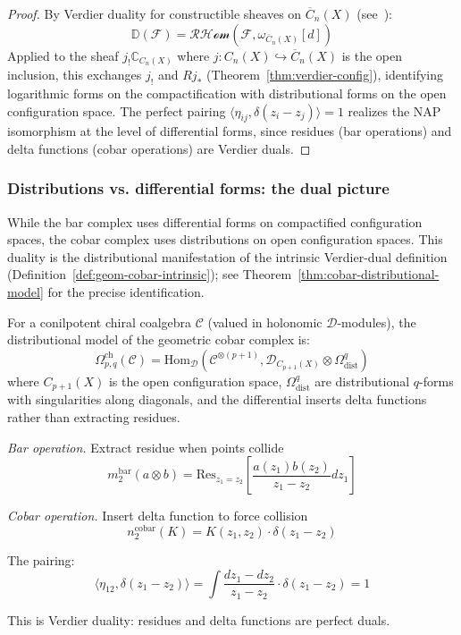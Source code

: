 \begin{proof}
By Verdier duality for constructible sheaves on $\overline{C}_n(X)$ (see~\cite{KashiwaraSchapira}):
\[\mathbb{D}(\mathcal{F}) = \mathcal{RHom}(\mathcal{F}, \omega_{\overline{C}_n(X)}[d])\]
Applied to the sheaf $j_!\mathbb{C}_{C_n(X)}$ where $j: C_n(X) \hookrightarrow \overline{C}_n(X)$ is the open inclusion, this exchanges $j_!$ and $Rj_*$ (Theorem~\ref{thm:verdier-config}), identifying logarithmic forms on the compactification with distributional forms on the open configuration space. The perfect pairing $\langle \eta_{ij}, \delta(z_i - z_j) \rangle = 1$ realizes the NAP isomorphism at the level of differential forms, since residues (bar operations) and delta functions (cobar operations) are Verdier duals.
\end{proof}

\subsubsection{Distributions vs. differential forms: the dual picture}

While the bar complex uses differential forms on compactified configuration spaces, the cobar complex uses distributions on open configuration spaces. This duality is the distributional manifestation of the intrinsic Verdier-dual definition (Definition~\ref{def:geom-cobar-intrinsic}); see Theorem~\ref{thm:cobar-distributional-model} for the precise identification.

\begin{definition}\label{def:geom-cobar-precise}
For a conilpotent chiral coalgebra $\mathcal{C}$ (valued in holonomic $\mathcal{D}$-modules), the distributional model of the geometric cobar complex is:
\[\Omega^{\text{ch}}_{p,q}(\mathcal{C}) = \text{Hom}_{\mathcal{D}}\left(\mathcal{C}^{\otimes(p+1)}, \mathcal{D}_{C_{p+1}(X)} \otimes \Omega^q_{\text{dist}}\right)\]
where $C_{p+1}(X)$ is the open configuration space, $\Omega^q_{\text{dist}}$ are distributional $q$-forms with singularities along diagonals, and the differential inserts delta functions rather than extracting residues.
\end{definition}

\begin{example}
\emph{Bar operation.} Extract residue when points collide
\[m_2^{\text{bar}}(a \otimes b) = \text{Res}_{z_1=z_2}\left[\frac{a(z_1)b(z_2)}{z_1-z_2}dz_1\right]\]

\emph{Cobar operation.} Insert delta function to force collision
\[n_2^{\text{cobar}}(K) = K(z_1,z_2) \cdot \delta(z_1-z_2)\]

The pairing:
\[\langle \eta_{12}, \delta(z_1-z_2) \rangle = \int \frac{dz_1-dz_2}{z_1-z_2} \cdot \delta(z_1-z_2) = 1\]

This is Verdier duality: residues and delta functions are perfect duals.
\end{example}

